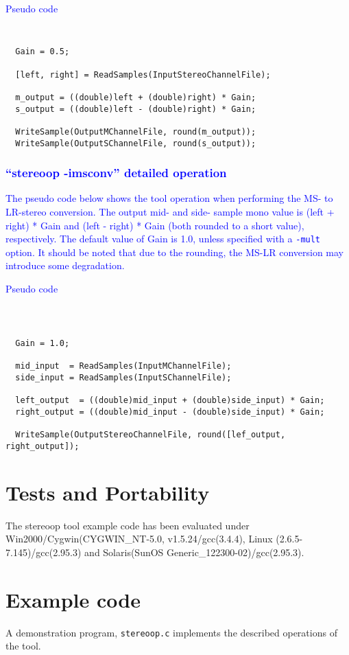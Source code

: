 \textcolor{blue}{
Pseudo code
}
{\tt\small
\begin{verbatim}
  Gain = 0.5;

  [left, right] = ReadSamples(InputStereoChannelFile);

  m_output = ((double)left + (double)right) * Gain;
  s_output = ((double)left - (double)right) * Gain;

  WriteSample(OutputMChannelFile, round(m_output));
  WriteSample(OutputSChannelFile, round(s_output));
\end{verbatim}
}

\textcolor{blue}{
\subsubsection{``stereoop -imsconv'' detailed operation}
The pseudo code below shows the tool operation when performing the MS-
to LR-stereo conversion. The output mid- and side- sample mono value
is (left + right) * Gain and (left - right) * Gain (both rounded to a
short value), respectively. The default value of Gain is 1.0, unless
specified with a {\tt -mult} option. It should be noted that due to
the rounding, the MS-LR conversion may introduce some degradation.
}

\textcolor{blue}{
Pseudo code
}
{\tt\small
\begin{verbatim}

  Gain = 1.0;

  mid_input  = ReadSamples(InputMChannelFile);
  side_input = ReadSamples(InputSChannelFile);

  left_output  = ((double)mid_input + (double)side_input) * Gain;
  right_output = ((double)mid_input - (double)side_input) * Gain;

  WriteSample(OutputStereoChannelFile, round([lef_output, right_output]);
\end{verbatim}
}

\section{Tests and Portability}
The stereoop tool example code has been evaluated under
Win2000/Cygwin(CYGWIN\_NT-5.0, v1.5.24/gcc(3.4.4), Linux
(2.6.5-7.145)/gcc(2.95.3) and Solaris(SunOS
Generic\_122300-02)/gcc(2.95.3).

\section{Example code}

A demonstration program, {\tt stereoop.c} implements the described
operations of the tool.
